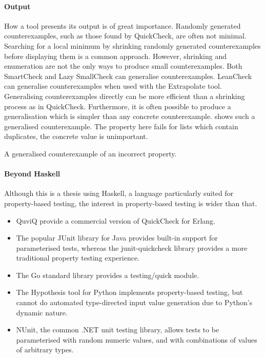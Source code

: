 \paragraph{Output}
How a tool presents its output is of great importance.  Randomly
generated counterexamples, such as those found by
QuickCheck\cite{claessen2000}, are often not minimal.  Searching for a
local minimum by shrinking randomly generated counterexamples before
displaying them is a common approach.  However, shrinking and
enumeration are not the only ways to produce small counterexamples.
Both SmartCheck\cite{pike2014} and Lazy SmallCheck\cite{runciman2008}
can generalise counter\-examples.  LeanCheck\cite{braquehais2017lean}
can generalise counterexamples when used with the
Extrapolate\cite{braquehais2017ifl} tool.  Generalising
counterexamples directly can be more efficient than a shrinking
process as in QuickCheck\cite{pike2014}.  Furthermore, it is often
possible to produce a generalisation which is simpler than any
concrete counterexample.   shows such a generalised
counterexample.  The property here fails for lists which contain
duplicates, the concrete value is unimportant.

\begin{listing}
\centering
{}
\caption{A generalised counterexample of an incorrect property.}\label{lst:gencntr}
\end{listing}

\paragraph{Beyond Haskell}
Although this is a thesis using Haskell, a language particularly
suited for property-based testing, the interest in property-based
testing is wider than that.

\begin{itemize}
\item QuviQ provide a commercial version of QuickCheck for
  Erlang\cite{arts2006}.
\item The popular JUnit library for Java provides built-in support for
  parameterised tests\cite{parameterized_tests}, whereas the
  junit-quickcheck\cite{junit_quickcheck} library provides a more
  traditional property testing experience.
\item The Go standard library provides a
  testing/quick\cite{testing_quick} module.
\item The Hypothesis\cite{hypothesis_python} tool for Python
  implements property-based testing, but cannot do automated
  type-directed input value generation due to Python's dynamic nature.
\item NUnit, the common .NET unit testing library, allows tests to be
  parameterised with random numeric values\cite{random_attribute}, and with
  combinations of values of arbitrary types\cite{values_attribute}.
\end{itemize}

